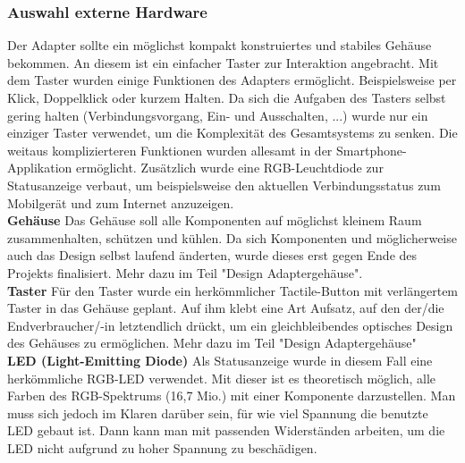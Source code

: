 \documentclass[11pt, twoside]{article}
\begin{document}
\subsubsection{Auswahl externe Hardware}
Der Adapter sollte ein möglichst kompakt konstruiertes und stabiles Gehäuse bekommen. An diesem ist ein einfacher Taster zur Interaktion angebracht. Mit dem Taster wurden einige Funktionen des Adapters ermöglicht. Beispielsweise per Klick, Doppelklick oder kurzem Halten. Da sich die Aufgaben des Tasters selbst gering halten (Verbindungsvorgang, Ein- und Ausschalten, ...) wurde nur ein einziger Taster verwendet, um die Komplexität des Gesamtsystems zu senken. Die weitaus komplizierteren Funktionen wurden allesamt in der Smartphone-Applikation ermöglicht. Zusätzlich wurde eine RGB-Leuchtdiode zur Statusanzeige verbaut, um beispielsweise den aktuellen Verbindungsstatus zum Mobilgerät und zum Internet anzuzeigen. \newline \\
\textbf{Gehäuse} \newline
Das Gehäuse soll alle Komponenten auf möglichst kleinem Raum zusammenhalten, schützen und kühlen. Da sich Komponenten und möglicherweise auch das Design selbst laufend änderten, wurde dieses erst gegen Ende des Projekts finalisiert. Mehr dazu im Teil "Design Adaptergehäuse". \newline \\
\textbf{Taster} \newline
Für den Taster wurde ein herkömmlicher Tactile-Button mit verlängertem Taster in das Gehäuse geplant. Auf ihm klebt eine Art Aufsatz, auf den der/die Endverbraucher/-in letztendlich drückt, um ein gleichbleibendes optisches Design des Gehäuses zu ermöglichen. Mehr dazu im Teil "Design Adaptergehäuse"\newline \\
\textbf{LED (Light-Emitting Diode)} \newline
Als Statusanzeige wurde in diesem Fall eine herkömmliche RGB-LED verwendet. Mit dieser ist es theoretisch möglich, alle Farben des RGB-Spektrums (16,7 Mio.) mit einer Komponente darzustellen.\newline
Man muss sich jedoch im Klaren darüber sein, für wie viel Spannung die benutzte LED gebaut ist. Dann kann man mit passenden Widerständen arbeiten, um die LED nicht aufgrund zu hoher Spannung zu beschädigen.
\vspace{4mm} \newline
\parencite[vgl.][]{noauthor_urlnl05_nodate}
\end{document}
